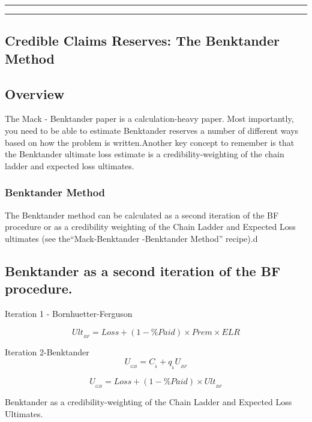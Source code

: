 \documentclass[
]{article}
\begin{document}
\begin{center}\rule{0.5\linewidth}{0.5pt}\end{center}

\begin{center}\rule{0.5\linewidth}{0.5pt}\end{center}

\subsection{Credible Claims Reserves: The Benktander
Method}\label{credible-claims-reserves-the-benktander-method}

\subsection{Overview}\label{overview}

The Mack - Benktander paper is a calculation-heavy paper. Most
importantly, you need to be able to estimate Benktander reserves a
number of different ways based on how the problem is written.Another key
concept to remember is that the Benktander ultimate loss estimate is a
credibility-weighting of the chain ladder and expected loss ultimates.

\subsubsection{Benktander Method}\label{benktander-method}

The Benktander method can be calculated as a second iteration of the BF
procedure or as a credibility weighting of the Chain Ladder and Expected
Loss ultimates (see the``Mack-Benktander -Benktander Method'' recipe).d

\subsection{Benktander as a second iteration of the BF
procedure.}\label{benktander-as-a-second-iteration-of-the-bf-procedure.}

Iteration 1 - Bornhuetter-Ferguson

\[Ult_{_{BF}}=Loss+(1-\%Paid)\times Prem\times ELR\]

Iteration 2-Benktander \[\boxed{U_{_{GB}}=C_{_k}+q_{_k}U_{_{BF}}}\]

\[U_{_{GB}}=Loss+(1-\%Paid)\times Ult_{_{BF}}\]

Benktander as a credibility-weighting of the Chain Ladder and Expected
Loss Ultimates.
\end{document}
